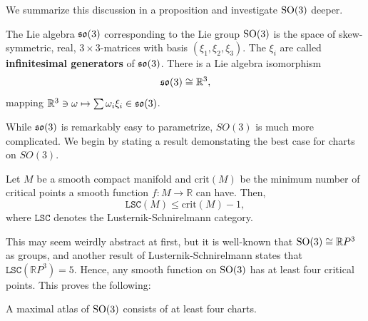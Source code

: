 We summarize this discussion in a proposition and investigate $\operatorname{SO}(3)$ deeper.
\begin{theorem}
    The Lie algebra $\operatorname{\mathfrak{s}\mathfrak{o}}(3)$ corresponding to the Lie group $\operatorname{SO}(3)$ is the space of skew-symmetric, real, $3 \times 3$-matrices with basis $(\xi_1,\xi_2,\xi_3)$. The $\xi_i$ are called \textbf{infinitesimal generators} of $\operatorname{\mathfrak{s}\mathfrak{o}}(3)$. There is a Lie algebra isomorphism
    \[
    \operatorname{\mathfrak{s}\mathfrak{o}}(3) \cong \mathbb{R}^3
    ,\] mapping $\mathbb{R}^3 \ni \omega \mapsto \sum \omega_i\xi_i \in \operatorname{\mathfrak{s}\mathfrak{o}}(3)$.
\end{theorem}
While $\operatorname{\mathfrak{s}\mathfrak{o}}(3)$ is remarkably easy to parametrize, $SO(3)$ is much more complicated. We begin by stating a result demonstating the best case for charts on $SO(3)$.
\begin{theorem}
    Let $M$ be a smooth compact manifold and $\text{crit}(M)$ be the minimum number of critical points a smooth function $f: M \to \mathbb{R}$ can have. Then, \[
        \mathtt{LSC}(M) \leq \text{crit}(M)-1
    ,\] where $\mathtt{LSC}$ denotes the Lusternik-Schnirelmann category.
\end{theorem}
This may seem weirdly abstract at first, but it is well-known that $\operatorname{SO}(3) \cong \mathbb{R}P^3$ as groups, and another result of Lusternik-Schnirelmann states that $\mathtt{LSC}(\mathbb{R}P^3)=5$. Hence, any smooth function on $\operatorname{SO}(3)$ has at least four critical points. This proves the following:
\begin{corollary}
    A maximal atlas of $\operatorname{SO}(3)$ consists of at least four charts.
\end{corollary}
